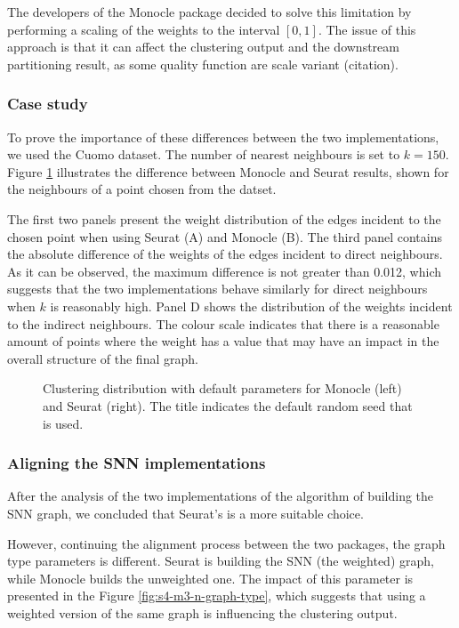 The developers of the Monocle package decided to solve this limitation by performing a scaling of the weights to the interval $[0, 1]$. The issue of this approach is that it can affect the clustering output and the downstream partitioning result, as some quality function are scale variant (citation).

\subsubsection{Case study}
To prove the importance of these differences between the two implementations, we used the Cuomo \cite{Cuomo2020} dataset. The number of nearest neighbours is set to $k = 150$. Figure \ref{fig:s4-m3-snn-3} illustrates the difference between Monocle and Seurat results, shown for the neighbours of a point chosen from the datset.

The first two panels present the weight distribution of the edges incident to the chosen point when using Seurat (A) and Monocle (B). The third panel contains the absolute difference of the weights of the edges incident to direct neighbours. As it can be observed, the maximum difference is not greater than 0.012, which suggests that the two implementations behave similarly for direct neighbours when $k$ is reasonably high. Panel D shows the distribution of the weights incident to the indirect neighbours. The colour scale indicates that there is a reasonable amount of points where the weight has a value that may have an impact in the overall structure of the final graph.
\begin{figure}[H]
    \centering
    \caption{\label{fig:s4-m3-snn-3}Clustering distribution with default parameters for Monocle (left) and Seurat (right). The title indicates the default random seed that is used.}
\end{figure}

\subsubsection{Aligning the SNN implementations}
After the analysis of the two implementations of the algorithm of building the SNN graph, we concluded that Seurat's is a more suitable choice.

However, continuing the alignment process between the two packages, the graph type parameters is different. Seurat is building the SNN (the weighted) graph, while Monocle builds the unweighted one. The impact of this parameter is presented in the Figure \ref{fig:s4-m3-n-graph-type}, which suggests that using a weighted version of the same graph is influencing the clustering output.

